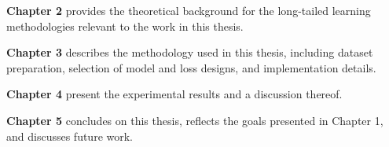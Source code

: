 \noindent \textbf{Chapter 2} provides the theoretical background for the long-tailed learning methodologies relevant to the work in this thesis.
\vspace{1em}

\noindent \textbf{Chapter 3} describes the methodology used in this thesis, including dataset preparation, selection of model and loss designs, and implementation details. 
\vspace{1em}

\noindent \textbf{Chapter 4} present the experimental results and a discussion thereof.
\vspace{1em}

\noindent \textbf{Chapter 5} concludes on this thesis, reflects the goals presented in Chapter 1, and discusses future work. 

